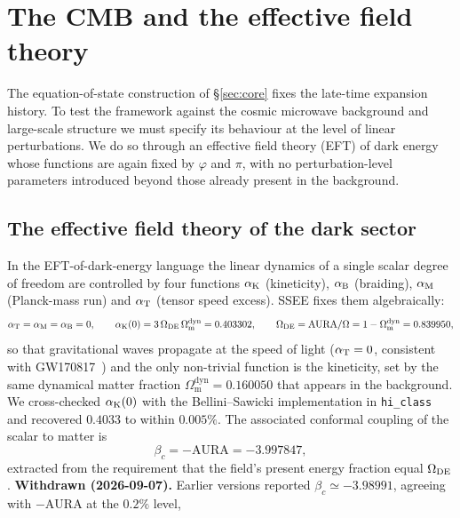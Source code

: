 \documentclass[aps,prd,preprint,amsmath,amssymb,nofootinbib,longbibliography]{revtex4-2}
\newcommand{\Om}{\Omega_{\mathrm{m}}}
\begin{document}
\section{The CMB and the effective field theory}
\label{sec:eft}

The equation-of-state construction of \S\ref{sec:core} fixes the
late-time expansion history. To test the framework against the cosmic
microwave background and large-scale structure we must specify its behaviour
at the level of linear perturbations. We do so through an effective field
theory (EFT) of dark energy whose functions are again fixed by $\varphi$ and
$\pi$, with no perturbation-level parameters introduced beyond those already
present in the background.

\subsection{The effective field theory of the dark sector}
\label{sec:eft-functions}
In the EFT-of-dark-energy language \citep{Cheung2008,Gubitosi2013,Bellini2014} the linear
dynamics of a single scalar degree of freedom are controlled by four
functions $\alpha_{\rm K}$ (kineticity), $\alpha_{\rm B}$ (braiding),
$\alpha_{\rm M}$ (Planck-mass run) and $\alpha_{\rm T}$ (tensor speed excess).
SSEE fixes them algebraically:
\begin{equation}
  \label{eq:eft-alphas}
  \alpha_{\rm T}=\alpha_{\rm M}=\alpha_{\rm B}=0,
  \qquad
  \alpha_{\rm K}(0)=3\,\Omega_{\rm DE}\,\Om^{\mathrm{dyn}}=0.403302 ,
  \qquad
  \Omega_{\rm DE}=\mathrm{AURA}/\Omega=1-\Om^{\mathrm{dyn}}=0.839950 ,
\end{equation}
so that gravitational waves propagate at the speed of light
($\alpha_{\rm T}=0$, consistent with GW170817~\citep{GW170817}) and the only non-trivial
function is the kineticity, set by the same dynamical matter fraction
$\Om^{\mathrm{dyn}}=0.160050$ that appears in the background. We cross-checked
$\alpha_{\rm K}(0)$ with the Bellini--Sawicki implementation in \texttt{hi\_class}
\citep{Bellini2015} and recovered $0.4033$ to within $0.005\%$. The associated conformal coupling
of the scalar to matter is
\begin{equation}
  \label{eq:betac}
  \beta_c=-\mathrm{AURA}=-3.997847 ,
\end{equation}
extracted from the requirement that the field's present energy fraction equal
$\Omega_{\rm DE}$. \textbf{Withdrawn (2026-09-07).} Earlier versions reported
$\beta_c\simeq-3.98991$, agreeing with $-\mathrm{AURA}$ at the $0.2\%$ level,
\end{document}
